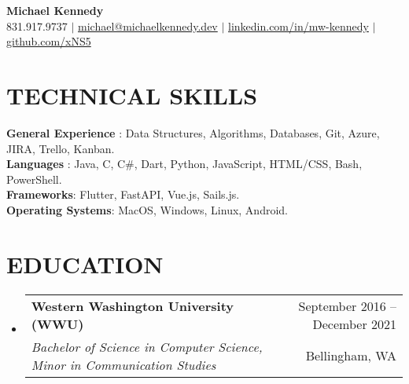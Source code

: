 \documentclass[letterpaper,11pt]{article}
\makeatletter
\newcommand{\resumeSubheading}[4]{
  \vspace{-1pt}\item
    \begin{tabular*}{\textwidth}[t]{l@{\extracolsep{\fill}}r}
      \textbf{#1} & {\color{dark-grey}\small #2}\vspace{1pt}\\ %
      \textit{#3} & {\color{dark-grey} \small #4}\\ %
    \end{tabular*}\vspace{-4pt}
}
\newcommand{\resumeSubHeadingListStart}{\begin{itemize}[leftmargin=0in, label={}]}
\newcommand{\resumeSubHeadingListEnd}{\end{itemize}}
\makeatother
\begin{document}

\begin{center}

    \textbf{\Huge Michael Kennedy} \\ \vspace{5pt}
    \small \faPhone \hspace{2pt} 831.917.9737 \hspace{1pt} $|$
    \hspace{1pt} \faEnvelope \hspace{2pt} \href{mailto:michael@michaelkennedy.dev}{michael@michaelkennedy.dev} \hspace{1pt} $|$ 
    \hspace{1pt} \faLinkedinSquare \hspace{2pt} \href{https://www.linkedin.com/in/mw-kennedy}{linkedin.com/in/mw-kennedy} \hspace{1pt}$|$
    \hspace{1pt} \faGithubSquare \hspace{2pt} \href{https://github.com/xNS5}{github.com/xNS5}
    \\ \vspace{-3pt}
\end{center}

\section{TECHNICAL SKILLS}
 \begin{itemize}[leftmargin=0in, label={}]
    \small{\item{
    \textbf{General Experience} {: Data Structures, Algorithms, Databases, Git, Azure, JIRA, Trello, Kanban.}\\
     \textbf{Languages} {: Java, C, C\#, Dart, Python, JavaScript, HTML/CSS, Bash, PowerShell.} \\
     \textbf{Frameworks}{: Flutter, FastAPI, Vue.js, Sails.js.}\\
     \textbf{Operating Systems}{: MacOS, Windows, Linux, Android.}
    }}
 \end{itemize}
 
\section {EDUCATION}
  \resumeSubHeadingListStart
    \resumeSubheading
      {Western Washington University (WWU)}{September 2016 -- December 2021}
      {Bachelor of Science in Computer Science, Minor in Communication Studies}{Bellingham, WA} 
  \resumeSubHeadingListEnd
\end{document}
